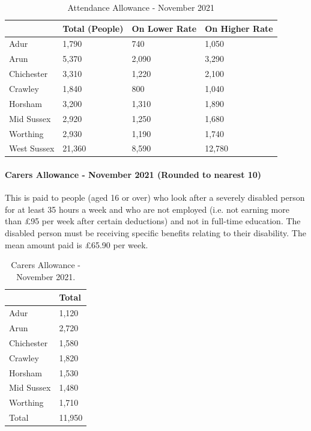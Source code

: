 \begin{table}[hbt]
    \caption{Attendance Allowance - November 2021}
    \centering
    \begin{tabular}{llll}
    \toprule
    \ & Total (People) & On Lower Rate & On Higher Rate \\
    \midrule
    Adur & 1,790 & 740 & 1,050 \\
    Arun & 5,370 & 2,090 & 3,290 \\
    Chichester & 3,310 & 1,220 & 2,100 \\
    Crawley & 1,840 & 800 & 1,040 \\
    Horsham & 3,200 & 1,310 & 1,890 \\
    Mid Sussex & 2,920 & 1,250 & 1,680 \\
    Worthing & 2,930 & 1,190 & 1,740 \\
    West Sussex & 21,360 & 8,590 & 12,780 \\
    \bottomrule
    \end{tabular}
    \label{tab:wa:att_all}
\end{table}



\paragraph{Carers Allowance - November 2021 (Rounded to nearest 10)} This is paid to people (aged 16 or over) who look after a severely disabled person for at least 35 hours a week and who are not employed (i.e. not earning more than £95 per week after certain deductions) and not in full-time education. The disabled person must be receiving specific benefits relating to their disability. The mean amount paid is £65.90 per week.

\begin{table}[hbt]
    \caption{Carers Allowance - November 2021.}
    \centering
    \begin{tabular}{ll}
    \toprule
    \ & Total \\
    \midrule
    Adur & 1,120 \\
    Arun & 2,720 \\
    Chichester & 1,580 \\
    Crawley & 1,820 \\
    Horsham & 1,530 \\
    Mid Sussex & 1,480 \\
    Worthing & 1,710 \\
    Total & 11,950 \\
    \bottomrule
    \end{tabular}
    \label{tab:wa:car_all}
\end{table}

